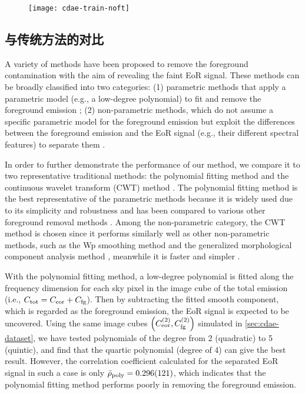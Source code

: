 \begin{figure}[htp]
  \centering
  \texttt{[image: cdae-train-noft]}
  \label{fig:cdae-train-noft}
\end{figure}


\subsection{与传统方法的对比}

A variety of methods have been proposed to remove the foreground
contamination with the aim of revealing the faint EoR signal.
These methods can be broadly classified into two categories:
(1) parametric methods that apply a parametric model (e.g., a low-degree
polynomial) to fit and remove the foreground emission
\cite{wang2006,jelic2008,liu2009fgrm,wang2013,bonaldi2015};
(2) non-parametric methods, which do not assume a specific parametric model
for the foreground emission but exploit the differences between the
foreground emission and the EoR signal (e.g., their different spectral
features) to separate them
\cite{harker2009,chapman2012,chapman2013,gu2013,mertens2018}.

In order to further demonstrate the performance of our method, we compare
it to two representative traditional methods:
the polynomial fitting method \cite{wang2006} and
the continuous wavelet transform (CWT) method \cite{gu2013}.
The polynomial fitting method is the best representative of the parametric
methods because it is widely used due to its simplicity and robustness
\cite{jelic2008,liu2009ps,pritchard2010}
and has been compared to various other foreground removal methods
\cite{harker2009,alonso2015,chapman2015}.
Among the non-parametric category, the CWT method is chosen since it
performs similarly well as other non-parametric methods, such as the
Wp smoothing method \cite{harker2009} and the generalized morphological
component analysis method \cite{chapman2013},
meanwhile it is faster and simpler \cite{gu2013,chapman2015}.

With the polynomial fitting method,
a low-degree polynomial is fitted along the frequency dimension for each
sky pixel in the image cube of the total emission (i.e.,
$C_{\mathrm{tot}} = C_{\mathrm{eor}} + C_{\mathrm{fg}}$).
Then by subtracting the fitted smooth component, which is regarded as
the foreground emission, the EoR signal is expected to be uncovered.
Using the same image cubes
$\left( C_{\mathrm{eor}}^{(2)}, C_{\mathrm{fg}}^{(2)} \right)$
simulated in \autoref{sec:cdae-dataset},
we have tested polynomials of the degree from 2 (quadratic) to
5 (quintic), and find that the quartic polynomial (degree of 4)
can give the best result.
However, the correlation coefficient calculated for the separated EoR
signal in such a case is only
$\bar{\rho}_{\mathrm{poly}} = \num{0.296 +- 0.121}$,
which indicates that the polynomial fitting method performs poorly in
removing the foreground emission.

